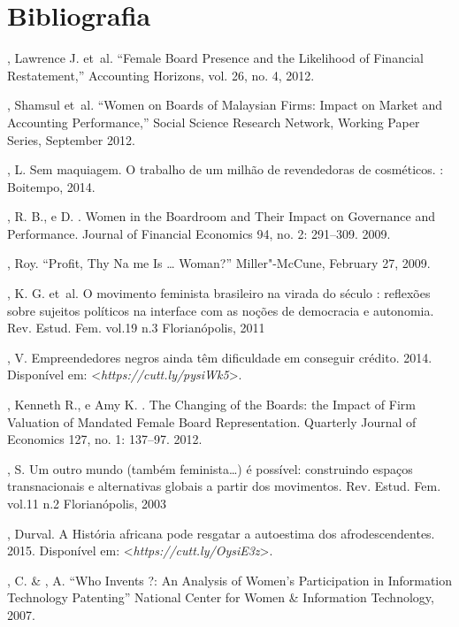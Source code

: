 \chapter{Bibliografia}

\begin{bibliohedra}
, Lawrence J. et~al. ``Female Board Presence and the Likelihood
of Financial Restatement,'' Accounting Horizons, vol. 26, no. 4, 2012.

, Shamsul et~al. ``Women on Boards of Malaysian Firms: Impact
on Market and Accounting Performance,'' Social Science Research Network,
Working Paper Series, September 2012.

, L. Sem maquiagem. O trabalho de um milhão de revendedoras de
cosméticos. : Boitempo, 2014.

, R. B., e D. . Women in the Boardroom and Their Impact on
Governance and Performance. Journal of Financial Economics 94, no. 2:
291--309. 2009.

, Roy. ``Profit, Thy Na me Is \ldots{} Woman?'' Miller"-McCune,
February 27, 2009.

, K. G. et~al. O movimento feminista brasileiro na virada do
século : reflexões sobre sujeitos políticos na interface com as noções
de democracia e autonomia. Rev. Estud. Fem. vol.19 n.3 Florianópolis,
2011

, V. Empreendedores negros ainda têm dificuldade em conseguir
crédito. 2014.
Disponível em: \textless\emph{https://cutt.ly/pysiWk5}\textgreater{}.

, Kenneth R., e Amy K. . The Changing of the Boards: the
Impact of Firm Valuation of Mandated Female Board Representation.
Quarterly Journal of Economics 127, no. 1: 137--97. 2012.

, S. Um outro mundo (também feminista\ldots{}) é possível: construindo
espaços transnacionais e alternativas globais a partir dos movimentos.
Rev. Estud. Fem. vol.11 n.2 Florianópolis, 2003

, Durval. A História africana pode resgatar a autoestima dos
afrodescendentes. 2015.
Disponível em: \textless{}\emph{https://cutt.ly/OysiE3z}\textgreater{}.

, C. \& , A. ``Who Invents ?: An Analysis of Women's
Participation in Information Technology Patenting'' National Center for
Women \& Information Technology, 2007.


\end{bibliohedra}
